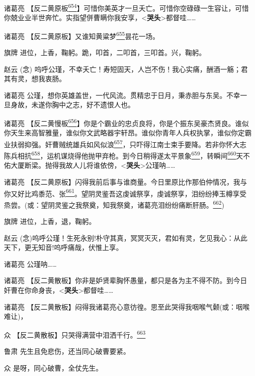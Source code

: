诸葛亮
【反二黄原板\protect\hyperlink{fn654}{\textsuperscript{654}}】可惜你美英才一旦夭亡。可惜你空碌碌一生容让，可惜你兢业业半世奔忙。实指望併曹瞒你我安享，\textless{}\textbf{哭头}\textgreater{}都督哇\ldots{}\ldots{}

诸葛亮
【反二黄原板】又谁知黄粱梦\protect\hyperlink{fn655}{\textsuperscript{655}}昙花一场。

旗牌 进位，上香，鞠躬。跪，叩首，二叩首，三叩首。兴，鞠躬。

赵云 (念)
呜呼公瑾，不幸夭亡！寿短固天，人岂不伤！我心实痛，酬酒一觞；君其有灵，想我衷肠。

诸葛亮
公瑾，想你英雄盖世，一代风流。贯精忠于日月，秉赤胆与东吴。不幸一旦身故，未遂你胸中之志，好不遗恨人也。

诸葛亮
【反二黄慢板\protect\hyperlink{fn656}{\textsuperscript{656}}】你是个霸业的忠贞良将，你是个振东吴豪杰贤良。谁似你天生来高智雅量，谁似你文武略器宇轩昂。谁似你青年人兵权执掌，谁似你定霸业扶弱抑强。奸曹贼统雄兵如风似浪\protect\hyperlink{fn657}{\textsuperscript{657}}，只吓得江南士束手要降。若非你怀大志陈兵相抗\protect\hyperlink{fn658}{\textsuperscript{658}}，运机谋烧得他抛甲弃枪。到今日稍得遂太平景象\protect\hyperlink{fn659}{\textsuperscript{659}}，转瞬间\protect\hyperlink{fn660}{\textsuperscript{660}}天不佑大厦断梁。抛得我故人儿将谁依傍，\textless{}\textbf{哭头}\textgreater{}公瑾呐\ldots{}\ldots{}

诸葛亮
【反二黄原板】闪得我前后事与谁商量。今日里原比作那伯仲情况，我与你又好比鸡黍范、张\protect\hyperlink{fn661}{\textsuperscript{661}}。{望阴灵鉴吾这虔诚祭享，虔诚祭享，泪纷纷捧玉樽享受烝尝。}(或：望阴灵鉴之我祭奠，知我祭奠，诸葛亮泪纷纷痛断肝肠。\protect\hyperlink{fn662}{\textsuperscript{662}})

旗牌 进位，上香，退，鞠躬。

赵云
(念)呜呼公瑾！生死永别!朴守其真，冥冥灭灭，君如有灵，乞见我心：从此天下，更无知音!呜呼痛哉，伏惟上享。

诸葛亮 公瑾呐\ldots{}\ldots{}

诸葛亮
【反二黄散板】你非是妒贤辈胸怀愚量，都只是各为主不得不防。到今日奸曹在你命身丧，\textless{}\textbf{哭头}\textgreater{}都督哇\ldots{}\ldots{}

诸葛亮
【反二黄散板】闷得我诸葛亮心意彷徨。思至此哭得我{咽喉气颡}(或：咽喉难让)，

众
【反二黄散板】只哭得满营中泪洒千行。\protect\hyperlink{fn663}{\textsuperscript{663}}

鲁肃 先生且免悲伤，还当同心破曹要紧。

众 是呀，同心破曹，全仗先生。

